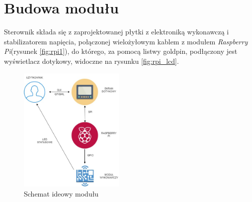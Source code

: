 \documentclass[12pt, eng, twoside, openany, final]{mgr}
\begin{document}
    \section{Budowa modułu}
    Sterownik składa się z zaprojektowanej płytki z elektroniką wykonawczą i stabilizatorem napięcia, połączonej wielożyłowym kablem z modułem \emph{Raspberry Pi}(rysunek \ref{fig:rpi1}), do którego, za pomocą listwy goldpin, podłączony jest wyświetlacz dotykowy, widoczne na rysunku \ref{fig:rpi_lcd}.
        \begin{figure}[H]
        \begin{center}
            \includegraphics[width=0.45\textwidth]{diagram.jpg}
            \caption{Schemat ideowy modułu}
        \end{center}
        \end{figure}
        
\end{document}
